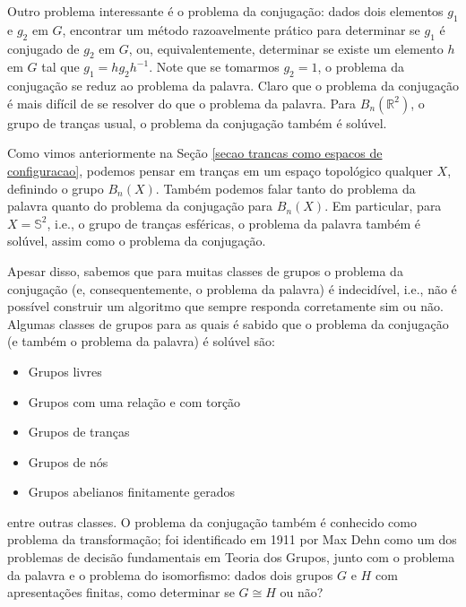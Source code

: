 	\par\vspace{0.3cm} Outro problema interessante é o problema da conjugação: dados dois elementos 
	$g_1$ e $g_2$ em $G$, encontrar um método razoavelmente prático para determinar se $g_1$ é conjugado de 
	$g_2$ em $G$, ou, equivalentemente, determinar se existe um elemento $h$ em $G$ tal que $g_1 = hg_2h^{-1}$. 
	Note que se tomarmos $g_2 = 1$, o problema da conjugação se reduz ao problema da palavra. Claro que o 
	problema da conjugação é mais difícil de se resolver do que o problema da palavra. Para $B_n(\mathbb{R}^2)$, 
	o grupo de tranças usual, o problema da conjugação também é solúvel.
	
	\par\vspace{0.3cm} Como vimos anteriormente na Seção \ref{secao trancas como espacos de configuracao}, 
	podemos pensar em tranças em um espaço topológico qualquer $X$, definindo o grupo $B_n(X)$. Também 
	podemos falar tanto do problema da palavra quanto do problema da conjugação para $B_n(X)$. Em particular, 
	para $X = \mathbb{S}^2$, i.e., o grupo de tranças esféricas, o problema da palavra também é solúvel, 
	assim como o problema da conjugação.
	
	\par\vspace{0.3cm} Apesar disso, sabemos que para muitas classes de grupos o problema da conjugação 
	(e, consequentemente, o problema da palavra) é indecidível, i.e., não é possível construir um algoritmo 
	que sempre responda corretamente sim ou não. Algumas classes de grupos para as quais é sabido que o 
	problema da conjugação (e também o problema da palavra) é solúvel são:
	\begin{itemize}
		\item Grupos livres
		\item Grupos com uma relação e com torção
		\item Grupos de tranças
		\item Grupos de nós
		\item Grupos abelianos finitamente gerados
	\end{itemize}
	entre outras classes. O problema da conjugação
	também é conhecido como problema da
	transformação; foi identificado em 1911 por Max Dehn como um dos problemas de decisão fundamentais 
	em Teoria dos Grupos, junto com o problema da palavra e o problema do isomorfismo:
	 dados dois grupos 
	$G$ e $H$ com apresentações finitas, como determinar se $G\cong H$ ou não?
